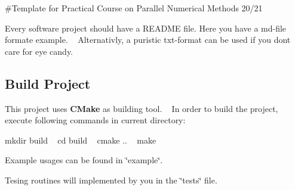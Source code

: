 \#\+Template for Practical Course on Parallel Numerical Methods 20/21

Every software project should have a R\+E\+A\+D\+ME file. Here you have a md-\/file formate example. ~\newline
Alternativly, a puristic txt-\/format can be used if you don\textquotesingle{}t care for eye candy.



 \subsection*{Build Project}

This project uses {\bfseries C\+Make} as building tool. ~\newline
In order to build the project, execute following commands in current directory\+:

mkdir build ~\newline
cd build ~\newline
cmake .. ~\newline
make ~\newline
 

 Example usages can be found in \char`\"{}example\char`\"{}.



 Tesing routines will implemented by you in the \char`\"{}tests\char`\"{} file. 